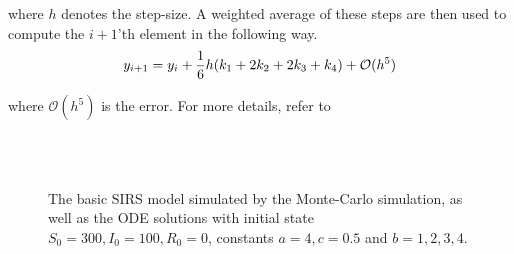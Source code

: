 \documentclass[10pt,showpacs,preprintnumbers,amsmath,amssymb,nofootinbib,aps,prl,twocolumn,groupedaddress,superscriptaddress,showkeys]{revtex4-1}
\begin{document}
    where $h$ denotes the step-size. A weighted average of these steps are then used to compute the $i+1$'th element in the following way.
    \begin{equation}
      y_{i+1} = y_i + \frac{1}{6}h\qty(k_1 + 2k_2 + 2k_3 + k_4) + \mathcal O(h^5)
    \end{equation}

    where $\mathcal O(h^5)$ is the error. For more details, refer to \textcite[p.~250]{compphys_lecnotes}

\begin{figure}[h!tb]
  \centering
   \\
   \\
  \caption{\label{fig:ab_plots}The basic SIRS model simulated by the Monte-Carlo simulation, as well as the ODE solutions with initial state $S_0 = 300, I_0 = 100, R_0 = 0$, constants $a=4, c=0.5$ and $b=1,2,3,4$.}
\end{figure}
\end{document}
